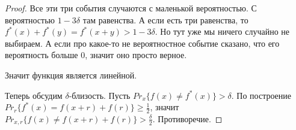 \begin{proof}
	Все эти три события случаются с маленькой вероятностью. С вероятностью 
	$1 - 3\delta$ там равенства. А если есть три равенства, 
	то $f^{*}(x) + f^{*}(y) = f^{*}(x + y) > 1 - 3\delta$. 
	Но тут уже мы ничего случайно не выбираем. 
	А если про какое-то не вероятностное событие сказано, что 
	его вероятность больше 0, значит оно просто верное. 

	Значит функция является линейной.

        Теперь обсудим $\delta$-близость. 
        Пусть $Pr_{x}\{f(x) \ne f^*(x)\} > \delta$.
        По построение $Pr_{r}\{f^{*}(x) = f(x + r) + f(r)\}\ge \frac{1}{2}$,
        значит $Pr_{x, r}\{f(x) \ne f(x + r) + f(r)\} > \frac{\delta}{2}$. 
        Противоречие.
\end{proof}
